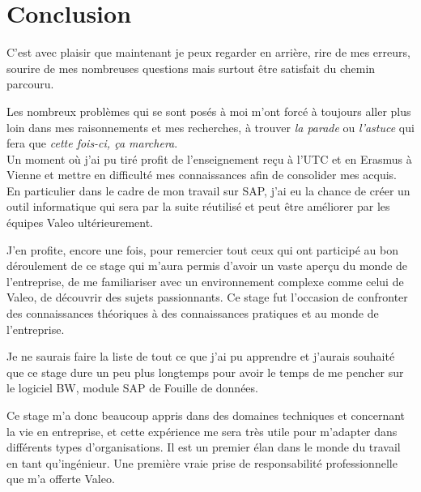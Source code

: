 \chapter{Conclusion}

C'est avec plaisir que maintenant je peux regarder en arrière, rire de mes erreurs, sourire de mes nombreuses questions mais surtout être satisfait du chemin parcouru.

Les nombreux problèmes qui se sont posés à moi m'ont forcé à toujours aller plus loin dans mes raisonnements et mes recherches, à trouver \textit{la parade} ou \textit{l'astuce} qui fera que \textit{cette fois-ci, ça marchera}.\\
Un moment où j'ai pu tiré profit de l'enseignement reçu à l'UTC et en Erasmus à Vienne et mettre en difficulté mes connaissances afin de consolider mes acquis.\\
En particulier dans le cadre de mon travail sur SAP, j'ai eu la chance de créer un outil informatique qui sera par la suite réutilisé et peut être améliorer par les équipes Valeo ultérieurement.

J'en profite, encore une fois, pour remercier tout ceux qui ont participé au bon déroulement de ce stage qui m'aura permis d'avoir un vaste aperçu du monde de l'entreprise, de me familiariser avec un environnement complexe comme celui de Valeo, de découvrir des sujets passionnants. Ce stage fut l'occasion de confronter des connaissances théoriques à des connaissances pratiques et au monde de l'entreprise.

Je ne saurais faire la liste de tout ce que j'ai pu apprendre et j'aurais souhaité que ce stage dure un peu plus longtemps pour avoir le temps de me pencher sur le logiciel BW, module SAP de Fouille de données.

Ce stage m'a donc beaucoup appris dans des domaines techniques et concernant la vie en entreprise, et cette expérience me sera très utile pour m'adapter dans différents types d'organisations. Il est un premier élan dans le monde du travail en tant qu'ingénieur. Une première vraie prise de responsabilité professionnelle que m'a offerte Valeo.